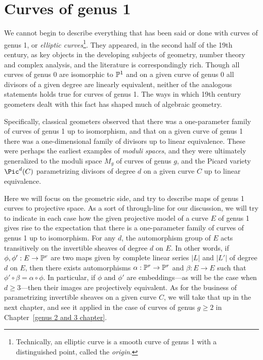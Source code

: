 \section{Curves of genus 1}


We cannot begin to describe everything that has been said or done with curves of genus 1, or \emph{elliptic curves}\footnote{Technically, an elliptic curve is a smooth curve of genus 1 with a distinguished point, called the \emph{origin}.}. They appeared, in the second half of the 19th century, as key objects in the developing subjects of geometry, number theory and complex analysis, and the literature is correspondingly rich. Though all curves of genus 0 are isomorphic to $\PP^1$ and on a given curve of genus 0 all divisors of a given degree are linearly equivalent, neither of the analogous statements holds true for curves of genus 1. The ways in which 19th century geometers dealt with this fact has shaped much of algebraic geometry.

Specifically, classical geometers observed that there was a one-parameter family of curves of genus 1 up to isomorphism, and that on a given curve of genus 1 there was a one-dimensional family of divisors up to linear equivalence. These were perhaps the earliest examples of \emph{moduli spaces}, and they were ultimately generalized to the moduli space $M_g$ of curves of genus $g$, and the Picard variety $\Pic^d(C)$ parametrizing divisors of degree $d$ on a given curve $C$ up to linear equivalence.

 Here we will focus on the geometric side, and try to describe maps of genus 1 curves to projective space. As a sort of through-line for our discussion, we will try to indicate in each case how the given projective model of a curve $E$ of genus 1 gives rise to the expectation that there is a one-parameter family of curves of genus 1 up to isomorphism. For any $d$, the automorphism group of $E$ acts transitively on the invertible sheaves of degree $d$ on $E$. In other words, if $\phi, \phi' : E \to \PP^r$ are two maps given by complete linear series $|L|$ and $|L'|$ of degree $d$ on $E$, then there exists  automorphisms $\alpha : \PP^r \to \PP^r$ and $\beta : E \to E$ such that $\phi' \circ \beta= \alpha \circ \phi$. In particular, if $\phi$ and $\phi'$ are embeddings---as will be the case when $d \geq 3$---then their images are projectively equivalent. As for the business of parametrizing invertible sheaves on a given curve $C$, we will take that up in the next chapter, and see it applied in the case of curves of genus $g \geq 2$ in Chapter~\ref{genus 2 and 3 chapter}.

